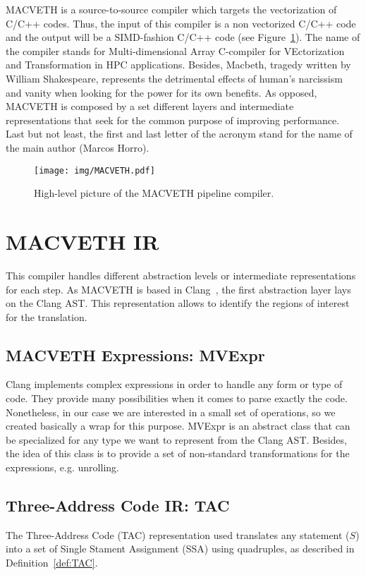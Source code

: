 \documentclass[a4paper,12pt]{memoir}
\begin{document}
MACVETH is a source-to-source compiler which targets the vectorization of C/C++ 
codes. Thus, the input of this compiler is a non vectorized C/C++ code and the 
output will be a SIMD-fashion C/C++ code (see Figure~\ref{fig:MACVETHarch}). 
The name of the compiler stands for Multi-dimensional Array C-compiler for 
VEctorization and Transformation in HPC applications. Besides, Macbeth, tragedy 
written by William Shakespeare, represents the detrimental effects of human's 
narcissism and vanity when looking for the power for its own benefits. As 
opposed, MACVETH is composed by a set different layers and intermediate 
representations that seek for the common purpose of improving performance. Last 
but not least, the first and last letter of the acronym stand for the name of 
the main author (Marcos Horro).

\begin{figure}
	\centering
	\texttt{[image: img/MACVETH.pdf]}
	\caption{High-level picture of the MACVETH pipeline compiler.}
	\label{fig:MACVETHarch}
\end{figure}

\chapter{MACVETH IR}



This compiler handles different abstraction levels or intermediate
representations for each step. As MACVETH is based in Clang~\cite{bib:clang},
the first abstraction layer lays on the Clang AST. This representation allows to
identify the regions of interest for the translation.

\section{MACVETH Expressions: MVExpr}
Clang implements complex expressions in order to handle any form or type of 
code. They 
provide many possibilities
when it comes to parse exactly the code. Nonetheless, in our case we are
interested in a small set of operations, so we created basically a wrap for this
purpose. MVExpr is an abstract class that can be specialized for any type we
want to represent from the Clang AST. Besides, the idea of this class is to
provide a set of non-standard transformations for the expressions, e.g.
unrolling.

\section{Three-Address Code IR: TAC}
The Three-Address Code (TAC) representation used translates any statement ($S$) 
into a
set of Single Stament Assignment (SSA) using quadruples, as described in 
Definition~\ref{def:TAC}.
\end{document}
